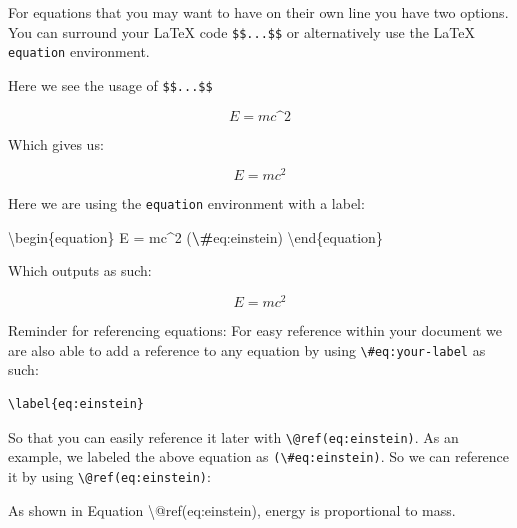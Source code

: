 \documentclass[
]{book}
\newenvironment{Shaded}{\begin{snugshade}}{\end{snugshade}}
\newcommand{\NormalTok}[1]{#1}
\newcommand{\SpecialCharTok}[1]{\textcolor[rgb]{0.81,0.36,0.00}{\textbf{#1}}}
\theoremstyle{definition}
\theoremstyle{definition}
\theoremstyle{definition}
\theoremstyle{definition}
\theoremstyle{remark}
\begin{document}
For equations that you may want to have on their own line you have two options. You can surround your LaTeX code \texttt{\$\$...\$\$} or alternatively use the LaTeX \texttt{equation} environment.

Here we see the usage of \texttt{\$\$...\$\$}

\begin{Shaded}
\begin{Highlighting}[]
\NormalTok{$$}
\NormalTok{E = mc\^{}2}
\NormalTok{$$}
\end{Highlighting}
\end{Shaded}

Which gives us:

\[
E = mc^2
\]

Here we are using the \texttt{equation} environment with a label:

\begin{Shaded}
\begin{Highlighting}[]
\NormalTok{\textbackslash{}begin\{equation\}}
\NormalTok{  E = mc\^{}2}
\NormalTok{  (}\SpecialCharTok{\textbackslash{}\#}\NormalTok{eq:einstein)}
\NormalTok{\textbackslash{}end\{equation\}}
\end{Highlighting}
\end{Shaded}

Which outputs as such:

\begin{equation}
  E = mc^2
  \label{eq:einstein}
\end{equation}

Reminder for referencing equations: For easy reference within your document we are also able to add a reference to any equation by using \texttt{\textbackslash{}\#eq:your-label} as such:

\begin{verbatim}
\label{eq:einstein}
\end{verbatim}

So that you can easily reference it later with \texttt{\textbackslash{}@ref(eq:einstein)}. As an example, we labeled the above equation as \texttt{(\textbackslash{}\#eq:einstein)}. So we can reference it by using \texttt{\textbackslash{}@ref(eq:einstein)}:

\begin{Shaded}
\begin{Highlighting}[]
\NormalTok{As shown in Equation \textbackslash{}@ref(eq:einstein), energy is proportional to mass.}
\end{Highlighting}
\end{Shaded}
\end{document}
